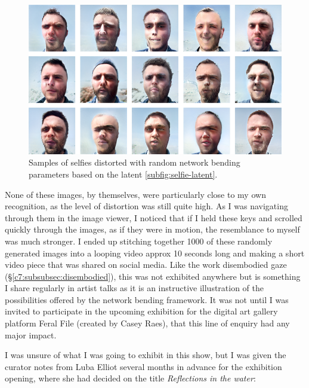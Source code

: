 \begin{figure}[!htb]
    \centering
    \captionsetup{justification=centering}
    \includegraphics[width=1\textwidth]{figures/c7_impact/selfie/selfie-series.png}
    \caption[Samples of selfies distorted with random network bending parameters]{ Samples of selfies distorted with random network bending parameters based on the latent \ref{subfig:selfie-latent}.}
    \label{fig:c7:selfie-series}
\end{figure}


None of these images, by themselves, were particularly close to my own recognition, as the level of distortion was still quite high.
As I was navigating through them in the image viewer, I noticed that if I held these keys and scrolled quickly through the images, as if they were in motion, the resemblance to myself was much stronger. 
I ended up stitching together 1000 of these randomly generated images into a looping video approx 10 seconds long and making a short video piece that was shared on social media. 
Like the work disembodied gaze (\S \ref{c7:subsubsec:disembodied}), this was not exhibited anywhere but is something I share regularly in artist talks as it is an instructive illustration of the possibilities offered by the network bending framework.
It was not until I was invited to participate in the upcoming exhibition for the digital art gallery platform Feral File (created by Casey Raes), that this line of enquiry had any major impact. 

I was unsure of what I was going to exhibit in this show, but I was given the curator notes from Luba Elliot several months in advance for the exhibition opening, where she had decided on the title \textit{Reflections in the water}:

